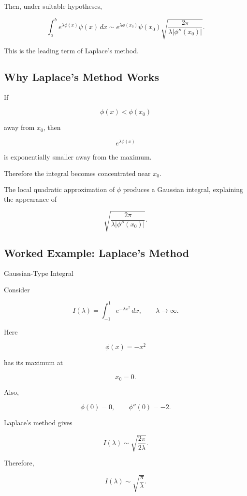 Then, under suitable hypotheses,

\[
\boxed{
\int_a^b
e^{\lambda\phi(x)}
\psi(x)\,dx
\sim
e^{\lambda\phi(x_0)}
\psi(x_0)
\sqrt{
\frac{2\pi}
{\lambda|\phi''(x_0)|}
}.
}
\]

This is the leading term of Laplace's method.

\subsection{Why Laplace's Method Works}
\label{subsec:why-laplace-method-works}

If

\[
\phi(x)<\phi(x_0)
\]

away from \(x_0\), then

\[
e^{\lambda\phi(x)}
\]

is exponentially smaller away from the maximum.

Therefore the integral becomes concentrated near \(x_0\).

The local quadratic approximation of \(\phi\) produces a Gaussian
integral, explaining the appearance of

\[
\boxed{
\sqrt{\frac{2\pi}{\lambda|\phi''(x_0)|}}.
}
\]

\subsection{Worked Example: Laplace's Method}
\label{subsec:worked-laplace-method}

\begin{workedexamplebox}{Gaussian-Type Integral}

Consider

\[
I(\lambda)
=
\int_{-1}^{1}
e^{-\lambda x^2}\,dx,
\qquad
\lambda\to\infty.
\]

Here

\[
\phi(x)=-x^2
\]

has its maximum at

\[
x_0=0.
\]

Also,

\[
\phi(0)=0,
\qquad
\phi''(0)=-2.
\]

Laplace's method gives

\[
I(\lambda)
\sim
\sqrt{
\frac{2\pi}
{2\lambda}
}.
\]

Therefore,

\begin{answerbox}
\[
\boxed{
I(\lambda)
\sim
\sqrt{\frac{\pi}{\lambda}}.
}
\]
\end{answerbox}

\end{workedexamplebox}


